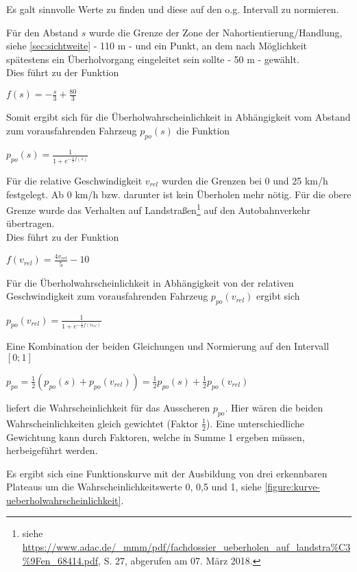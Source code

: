 Es galt sinnvolle Werte zu finden und diese auf den o.g. Intervall zu normieren.

Für den Abstand $ s $ wurde die Grenze der Zone der Nahortientierung/Handlung, siehe \cref{sec:sichtweite} - 110 m - und ein Punkt, an dem nach Möglichkeit spätestens ein Überholvorgang eingeleitet sein sollte - 50 m - gewählt.
\\
Dies führt zu der Funktion
\begin{center}
$ f(s) = -\frac{s}{3} + \frac{80}{3} $
\end{center}
Somit ergibt sich für die Überholwahrscheinlichkeit in Abhängigkeit vom Abstand zum vorausfahrenden Fahrzeug $ p_{po}(s) $ die Funktion
\begin{center}
$ p_{po}(s) = \frac{1}{1 + e^{-\frac{1}{2}f(s)}} $
\end{center}

\noindent
Für die relative Geschwindigkeit $ v_{rel} $ wurden die Grenzen bei 0 und 25 km/h festgelegt.
Ab 0 km/h bzw. darunter ist kein Überholen mehr nötig.
Für die obere Grenze wurde das Verhalten auf Landstraßen\footnote{siehe \url{https://www.adac.de/_mmm/pdf/fachdossier_ueberholen_auf_landstra\%C3\%9Fen_68414.pdf}, S. 27, abgerufen am 07. März 2018.}
auf den Autobahnverkehr übertragen.
\\
Dies führt zu der Funktion 
\begin{center}
$ f(v_{rel}) = \frac{4 v_{rel}}{5} - 10 $
\end{center}
Für die Überholwahrscheinlichkeit in Abhängigkeit von der relativen Geschwindigkeit zum vorausfahrenden Fahrzeug $ p_{po}(v_{rel}) $ ergibt sich
\begin{center}
$ p_{po}(v_{rel}) = \frac{1}{1 + e^{-\frac{1}{2}f(v_{rel})}} $
\end{center}

\noindent
Eine Kombination der beiden Gleichungen und Normierung auf den Intervall $ [0; 1] $
\begin{center}
$ p_{po} = \frac{1}{2}(p_{po}(s) + p_{po}(v_{rel})) = \frac{1}{2}p_{po}(s) + \frac{1}{2}p_{po}(v_{rel}) $
\end{center}
liefert die Wahrscheinlichkeit für das Ausscheren $ p_{po} $.
Hier wären die beiden Wahrscheinlichkeiten gleich gewichtet (Faktor $ \frac{1}{2} $). Eine unterschiedliche Gewichtung kann durch Faktoren, welche in Summe 1 ergeben müssen, herbeigeführt werden.

Es ergibt sich eine Funktionskurve mit der Ausbildung von drei erkennbaren Plateaus um die Wahrscheinlichkeitswerte 0, 0,5 und 1, siehe \cref{figure:kurve-ueberholwahrscheinlichkeit}.

